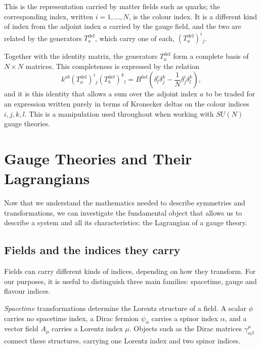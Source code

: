 This is the representation carried by matter fields such as quarks;
the corresponding index, written $i = 1,\dots,N$, is the colour
index. It is a different kind of index from the adjoint index $a$
carried by the gauge field, and the two are related by the
generators $T_a^{\mathrm{def}}$, which carry one of each,
$(T_a^{\mathrm{def}})^i{}_j$.

Together with the identity matrix, the generators
$T_a^{\mathrm{def}}$ form a complete basis of $N \times N$ matrices.
This completeness is expressed by the relation
\begin{equation}
    k^{ab} (T_a^{\mathrm{def}})^i{}_j (T_b^{\mathrm{def}})^k{}_l
    = B^{\mathrm{def}} \left(\delta^i_l \delta^k_j - \frac{1}{N}\delta^i_j \delta^k_l \right),
\end{equation}
and it is this identity that allows a sum over the adjoint index $a$
to be traded for an expression written purely in terms of Kronecker
deltas on the colour indices $i,j,k,l$. This is a manipulation used
throughout when working with $SU(N)$ gauge theories.


\section{Gauge Theories and Their Lagrangians}
\label{sec:theory-gauge}

Now that we understand the mathematics needed to describe symmetries and transformations, we can investigate the fundamental object that allows us to describe a system and all its characteristics: the Lagrangian of a gauge theory.

\subsection{Fields and the indices they carry}
\label{sec:theory-fields}

Fields can carry different kinds of indices, depending on how they transform.
For our purposes, it is useful to distinguish three main families: spacetime,
gauge and flavour indices.

\emph{Spacetime} transformations determine the Lorentz structure of a field.
A scalar $\phi$ carries no spacetime index, a Dirac fermion
$\psi_\alpha$ carries a spinor index $\alpha$, and a vector field
$A_\mu$ carries a Lorentz index $\mu$. Objects such as the Dirac matrices
$\gamma^\mu_{\alpha\beta}$ connect these structures, carrying one Lorentz
index and two spinor indices.

